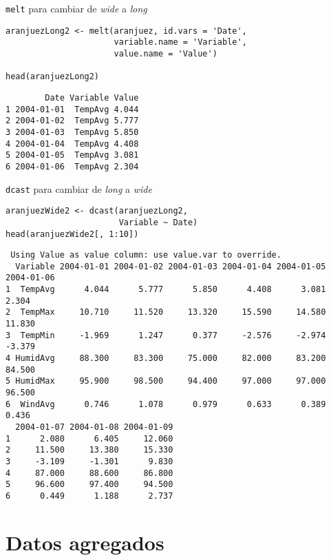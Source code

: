 \documentclass[xcolor={usenames,svgnames,dvipsnames}]{beamer}
\begin{document}
\begin{frame}[fragile,label=sec-3-3]{\texttt{melt} para cambiar de \emph{wide} a \emph{long}}
 \lstset{language=R,label= ,caption= ,numbers=none}
\begin{lstlisting}
aranjuezLong2 <- melt(aranjuez, id.vars = 'Date',
                      variable.name = 'Variable',
                      value.name = 'Value')

head(aranjuezLong2)
\end{lstlisting}

\begin{verbatim}
        Date Variable Value
1 2004-01-01  TempAvg 4.044
2 2004-01-02  TempAvg 5.777
3 2004-01-03  TempAvg 5.850
4 2004-01-04  TempAvg 4.408
5 2004-01-05  TempAvg 3.081
6 2004-01-06  TempAvg 2.304
\end{verbatim}
\end{frame}

\begin{frame}[fragile,label=sec-3-4]{\texttt{dcast} para cambiar de \emph{long} a \emph{wide}}
 \lstset{language=R,label= ,caption= ,numbers=none}
\begin{lstlisting}
aranjuezWide2 <- dcast(aranjuezLong2,
                       Variable ~ Date)
head(aranjuezWide2[, 1:10])
\end{lstlisting}

\begin{verbatim}
 Using Value as value column: use value.var to override.
  Variable 2004-01-01 2004-01-02 2004-01-03 2004-01-04 2004-01-05 2004-01-06
1  TempAvg      4.044      5.777      5.850      4.408      3.081      2.304
2  TempMax     10.710     11.520     13.320     15.590     14.580     11.830
3  TempMin     -1.969      1.247      0.377     -2.576     -2.974     -3.379
4 HumidAvg     88.300     83.300     75.000     82.000     83.200     84.500
5 HumidMax     95.900     98.500     94.400     97.000     97.000     96.500
6  WindAvg      0.746      1.078      0.979      0.633      0.389      0.436
  2004-01-07 2004-01-08 2004-01-09
1      2.080      6.405     12.060
2     11.500     13.380     15.330
3     -3.109     -1.301      9.830
4     87.000     88.600     86.800
5     96.600     97.400     94.500
6      0.449      1.188      2.737
\end{verbatim}
\end{frame}


\section{Datos agregados}
\label{sec-4}
\end{document}
